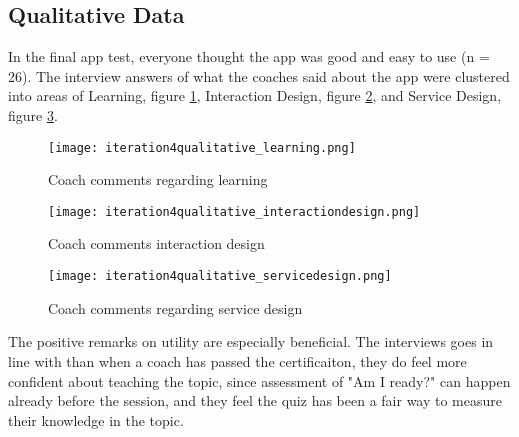 \subsection{Qualitative Data}

In the final app test, everyone thought the app was good and easy to use (n = 26). The interview answers of what the coaches said about the app were clustered into areas of Learning, figure \ref{fig:learning}, Interaction Design, figure \ref{fig:interactiondesign}, and Service Design, figure \ref{fig:servicedesign}.

\begin{figure}[h]
    \centering
    \texttt{[image: iteration4qualitative\_learning.png]}
    \caption{Coach comments regarding learning}
    \label{fig:learning}
\end{figure}

\begin{figure}[h]
    \centering
    \texttt{[image: iteration4qualitative\_interactiondesign.png]}
    \caption{Coach comments interaction design}
    \label{fig:interactiondesign}
\end{figure}

\begin{figure}[h]
    \centering
    \texttt{[image: iteration4qualitative\_servicedesign.png]}
    \caption{Coach comments regarding service design}
    \label{fig:servicedesign}
\end{figure}

The positive remarks on utility are especially beneficial. The interviews goes in line with than when a coach has passed the certificaiton, they do feel more confident about teaching the topic, since assessment of "Am I ready?" can happen already before the session, and they feel the quiz has been a fair way to measure their knowledge in the topic.
